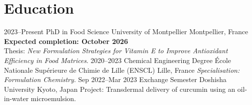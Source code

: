 \documentclass[11pt,a4paper,sans]{moderncv}
\begin{document}
\section{Education}
\cventry
{2023--Present}
{PhD in Food Science}
{University of Montpellier}
{Montpellier, France}
{}
{%
{\textbf{Expected completion: October 2026}\\
Thesis: \emph{New Formulation Strategies for Vitamin E to Improve Antioxidant
Efficiency in Food Matrices}.}
\cventry
{2020--2023}
{Chemical Engineering Degree}
{École Nationale Supérieure de Chimie de Lille (ENSCL)}
{Lille, France}
{}
{\textit{Specialisation: Formulation Chemistry.}
}
\cventry
{Sep 2022--Mar 2023}
{Exchange Semester}
{Doshisha University}
{Kyoto, Japan}
{}
{Project: Transdermal delivery of curcumin using an oil-in-water microemulsion.}
}
\end{document}
